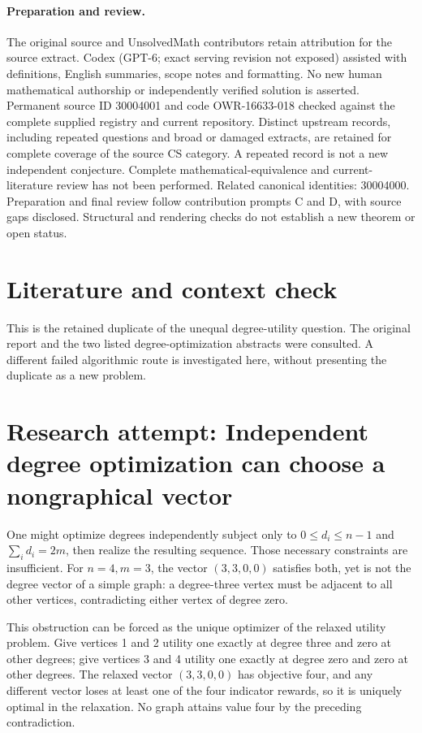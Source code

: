 \documentclass[11pt]{article}
\begin{document}
\paragraph{Preparation and review.}
The original source and UnsolvedMath contributors retain attribution for the source extract. Codex (GPT-6; exact serving revision not exposed) assisted with definitions, English summaries, scope notes and formatting. No new human mathematical authorship or independently verified solution is asserted. Permanent source ID 30004001 and code OWR-16633-018 checked against the complete supplied registry and current repository. Distinct upstream records, including repeated questions and broad or damaged extracts, are retained for complete coverage of the source CS category. A repeated record is not a new independent conjecture. Complete mathematical-equivalence and current-literature review has not been performed. Related canonical identities: 30004000. Preparation and final review follow contribution prompts C and D, with source gaps disclosed. Structural and rendering checks do not establish a new theorem or open status.
\label{end:30004001}

\section{Literature and context check}
This is the retained duplicate of the unequal degree-utility question. The original report and the two listed degree-optimization abstracts were consulted. A different failed algorithmic route is investigated here, without presenting the duplicate as a new problem.
\section{Research attempt: Independent degree optimization can choose a nongraphical vector}
One might optimize degrees independently subject only to $0\le d_i\le n-1$ and $\sum_i d_i=2m$, then realize the resulting sequence. Those necessary constraints are insufficient. For $n=4,m=3$, the vector $(3,3,0,0)$ satisfies both, yet is not the degree vector of a simple graph: a degree-three vertex must be adjacent to all other vertices, contradicting either vertex of degree zero.

This obstruction can be forced as the unique optimizer of the relaxed utility problem. Give vertices 1 and 2 utility one exactly at degree three and zero at other degrees; give vertices 3 and 4 utility one exactly at degree zero and zero at other degrees. The relaxed vector $(3,3,0,0)$ has objective four, and any different vector loses at least one of the four indicator rewards, so it is uniquely optimal in the relaxation. No graph attains value four by the preceding contradiction.
\end{document}
